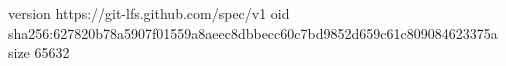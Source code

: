 version https://git-lfs.github.com/spec/v1
oid sha256:627820b78a5907f01559a8aeec8dbbecc60c7bd9852d659c61c809084623375a
size 65632
